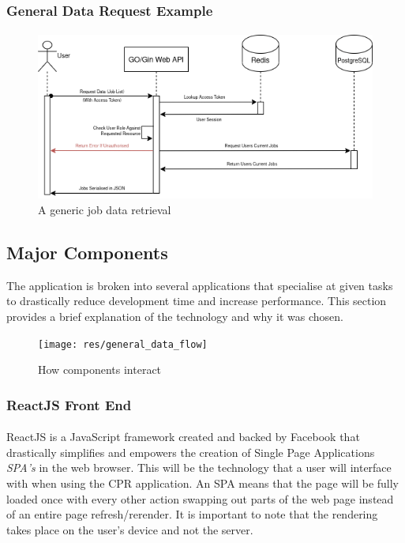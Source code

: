 \pagebreak

\subsubsection{General Data Request Example}
\paragraph{}

\begin{figure}[h!]
    \includegraphics[width=\textwidth]{res/general-api-request}
    \caption{A generic job data retrieval}
    \label{fig:general-api-req}
\end{figure}

\pagebreak
\subsection{Major Components}\label{subsec:major-components}
The application is broken into several applications that specialise at given tasks to drastically reduce development time
and increase performance.
This section provides a brief explanation of the technology and why it was chosen.

\begin{figure}[h!]
    \texttt{[image: res/general\_data\_flow]}
    \caption{How components interact}
    \label{fig:how-services-interact}
\end{figure}

\subsubsection{ReactJS Front End}
\paragraph{}
ReactJS is a JavaScript framework created and backed by Facebook that drastically simplifies and empowers the creation of Single Page Applications \emph{SPA's} in the
web browser.
This will be the technology that a user will interface with when using the CPR application.
An SPA means that the page will be fully loaded once with every other action  swapping out parts of the web page instead of
an entire page refresh/rerender.
It is important to note that the rendering takes place on the user's device and not the server.

